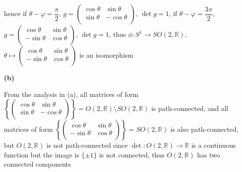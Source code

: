 \documentclass[10pt]{article}
\newcommand{\<}[1]{\langle #1 \rangle}
\begin{document}
hence if $\theta-\varphi=\dfrac{\pi}{2}$, $g=\left( {\begin{array}{cc}
   \cos{\theta} & \sin{\theta} \\
   \sin{\theta} & -\cos{\theta} \\
  \end{array} } \right)$, $\det{g}=1$, if $\theta-\varphi=\dfrac{3\pi}{2}$, $g=\left( {\begin{array}{cc}
   \cos{\theta} & \sin{\theta} \\
   -\sin{\theta} & \cos{\theta} \\
  \end{array} } \right)$, $\det{g}=1$, thus $\phi:S^1\rightarrow SO(2,\mathbb{R})$, $\theta\mapsto\left( {\begin{array}{cc}
   \cos{\theta} & \sin{\theta} \\
   -\sin{\theta} & \cos{\theta} \\
  \end{array} } \right)$ is an isomorphism \par
\textbf{(b)} \par
From the analysis in (a), all matrices of form $\left\{\left( {\begin{array}{cc}
   \cos{\theta} & \sin{\theta} \\
   \sin{\theta} & -\cos{\theta} \\
  \end{array} } \right)\right\}=O(2,\mathbb{R})\setminus SO(2,\mathbb{R})$ is path-connected, and all matrices of form $\left\{\left( {\begin{array}{cc}
   \cos{\theta} & \sin{\theta} \\
   -\sin{\theta} & \cos{\theta} \\
  \end{array} } \right)\right\}=SO(2,\mathbb{R})$ is also path-connected, but $O(2,\mathbb{R})$ is not path-connected since $\det:O(2,\mathbb{R})\rightarrow\mathbb{R}$ is a continuous function but the image is $\{\pm1\}$ is not connected, thus $O(2,\mathbb{R})$ has two connected components
\end{document}
